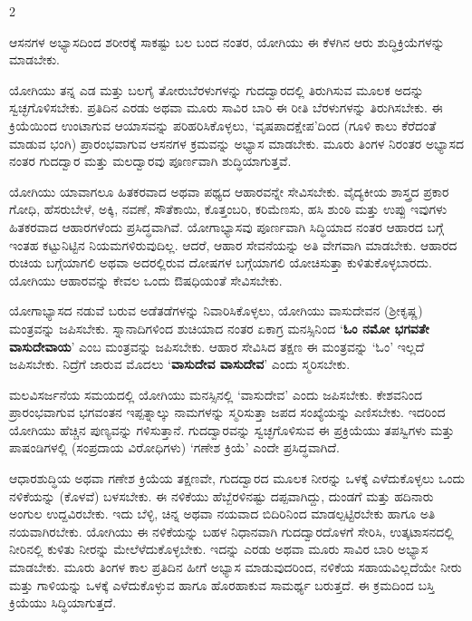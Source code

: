 \begin{multicols}{2}
\begin{kan}
ಆಸನಗಳ ಅಭ್ಯಾಸದಿಂದ ಶರೀರಕ್ಕೆ ಸಾಕಷ್ಟು ಬಲ ಬಂದ ನಂತರ, ಯೋಗಿಯು ಈ ಕೆಳಗಿನ ಆರು ಶುದ್ಧಿಕ್ರಿಯೆಗಳನ್ನು ಮಾಡಬೇಕು.
\vskip 7pt


ಯೋಗಿಯು ತನ್ನ ಎಡ ಮತ್ತು ಬಲಗೈ ತೋರುಬೆರಳುಗಳನ್ನು ಗುದದ್ವಾರದಲ್ಲಿ ತಿರುಗಿಸುವ ಮೂಲಕ ಅದನ್ನು ಸ್ವಚ್ಛಗೊಳಿಸಬೇಕು. ಪ್ರತಿದಿನ ಎರಡು ಅಥವಾ ಮೂರು ಸಾವಿರ ಬಾರಿ ಈ ರೀತಿ ಬೆರಳುಗಳನ್ನು ತಿರುಗಿಸಬೇಕು. ಈ ಕ್ರಿಯೆಯಿಂದ ಉಂಟಾಗುವ ಆಯಾಸವನ್ನು ಪರಿಹರಿಸಿಕೊಳ್ಳಲು, ‘ವೃಷಪಾದಕ್ಷೇಪ’ದಿಂದ (ಗೂಳಿ ಕಾಲು ಕೆರೆದಂತೆ ಮಾಡುವ ಭಂಗಿ) ಪ್ರಾರಂಭವಾಗುವ ಆಸನಗಳ ಕ್ರಮವನ್ನು ಅಭ್ಯಾಸ ಮಾಡಬೇಕು. ಮೂರು ತಿಂಗಳ ನಿರಂತರ ಅಭ್ಯಾಸದ ನಂತರ ಗುದದ್ವಾರ ಮತ್ತು ಮಲದ್ವಾರವು ಪೂರ್ಣವಾಗಿ ಶುದ್ಧಿಯಾಗುತ್ತವೆ.
\vskip 7pt


ಯೋಗಿಯು ಯಾವಾಗಲೂ ಹಿತಕರವಾದ ಅಥವಾ ಪಥ್ಯದ ಆಹಾರವನ್ನೇ ಸೇವಿಸಬೇಕು. ವೈದ್ಯಕೀಯ ಶಾಸ್ತ್ರದ ಪ್ರಕಾರ ಗೋಧಿ, ಹೆಸರುಬೇಳೆ, ಅಕ್ಕಿ, ನವಣೆ, ಸೌತೆಕಾಯಿ, ಕೊತ್ತಂಬರಿ, ಕರಿಮೆಣಸು, ಹಸಿ ಶುಂಠಿ ಮತ್ತು ಉಪ್ಪು ಇವುಗಳು ಹಿತಕರವಾದ ಆಹಾರಗಳೆಂದು ಪ್ರಸಿದ್ಧವಾಗಿವೆ. ಯೋಗಾಭ್ಯಾಸವು ಪೂರ್ಣವಾಗಿ ಸಿದ್ಧಿಯಾದ ನಂತರ ಆಹಾರದ ಬಗ್ಗೆ ಇಂತಹ ಕಟ್ಟುನಿಟ್ಟಿನ ನಿಯಮಗಳಿರುವುದಿಲ್ಲ. ಆದರೆ, ಆಹಾರ ಸೇವನೆಯನ್ನು ಅತಿ ವೇಗವಾಗಿ ಮಾಡಬೇಕು. ಆಹಾರದ ರುಚಿಯ ಬಗ್ಗೆಯಾಗಲಿ ಅಥವಾ ಅದರಲ್ಲಿರುವ ದೋಷಗಳ ಬಗ್ಗೆಯಾಗಲಿ ಯೋಚಿಸುತ್ತಾ ಕುಳಿತುಕೊಳ್ಳಬಾರದು. ಯೋಗಿಯು ಆಹಾರವನ್ನು ಕೇವಲ ಒಂದು ಔಷಧಿಯಂತೆ ಸೇವಿಸಬೇಕು.
\vskip 7pt


ಯೋಗಾಭ್ಯಾಸದ ನಡುವೆ ಬರುವ ಅಡೆತಡೆಗಳನ್ನು ನಿವಾರಿಸಿಕೊಳ್ಳಲು, ಯೋಗಿಯು ವಾಸುದೇವನ (ಶ್ರೀಕೃಷ್ಣ) ಮಂತ್ರವನ್ನು ಜಪಿಸಬೇಕು. ಸ್ನಾನಾದಿಗಳಿಂದ ಶುಚಿಯಾದ ನಂತರ ಏಕಾಗ್ರ ಮನಸ್ಸಿನಿಂದ ‘\textbf{ಓಂ ನಮೋ ಭಗವತೇ ವಾಸುದೇವಾಯ}’ ಎಂಬ ಮಂತ್ರವನ್ನು ಜಪಿಸಬೇಕು. ಆಹಾರ ಸೇವಿಸಿದ ತಕ್ಷಣ ಈ ಮಂತ್ರವನ್ನು ‘ಓಂ’ ಇಲ್ಲದೆ ಜಪಿಸಬೇಕು. ನಿದ್ರೆಗೆ ಜಾರುವ ಮೊದಲು ‘\textbf{ವಾಸುದೇವ ವಾಸುದೇವ}’ ಎಂದು ಸ್ಮರಿಸಬೇಕು.

ಮಲವಿಸರ್ಜನೆಯ ಸಮಯದಲ್ಲಿ ಯೋಗಿಯು ಮನಸ್ಸಿನಲ್ಲಿ ‘ವಾಸುದೇವ’ ಎಂದು ಜಪಿಸಬೇಕು. ಕೇಶವನಿಂದ ಪ್ರಾರಂಭವಾಗುವ ಭಗವಂತನ ಇಪ್ಪತ್ನಾಲ್ಕು ನಾಮಗಳನ್ನು ಸ್ಮರಿಸುತ್ತಾ ಜಪದ ಸಂಖ್ಯೆಯನ್ನು ಎಣಿಸಬೇಕು. ಇದರಿಂದ ಯೋಗಿಯು ಹೆಚ್ಚಿನ ಪುಣ್ಯವನ್ನು ಗಳಿಸುತ್ತಾನೆ. ಗುದದ್ವಾರವನ್ನು ಸ್ವಚ್ಛಗೊಳಿಸುವ ಈ ಪ್ರಕ್ರಿಯೆಯು ತಪಸ್ವಿಗಳು ಮತ್ತು ಪಾಷಂಡಿಗಳಲ್ಲಿ (ಸಂಪ್ರದಾಯ ವಿರೋಧಿಗಳು) ‘ಗಣೇಶ ಕ್ರಿಯೆ’ ಎಂದೇ ಪ್ರಸಿದ್ಧವಾಗಿದೆ.
\vskip 7pt


ಆಧಾರಶುದ್ಧಿಯ ಅಥವಾ ಗಣೇಶ ಕ್ರಿಯೆಯ ತಕ್ಷಣವೇ, ಗುದದ್ವಾರದ ಮೂಲಕ ನೀರನ್ನು ಒಳಕ್ಕೆ ಎಳೆದುಕೊಳ್ಳಲು ಒಂದು ನಳಿಕೆಯನ್ನು (ಕೊಳವೆ) ಬಳಸಬೇಕು. ಈ ನಳಿಕೆಯು ಹೆಬ್ಬೆರಳಿನಷ್ಟು ದಪ್ಪವಾಗಿದ್ದು, ದುಂಡಗೆ ಮತ್ತು ಹದಿನಾರು ಅಂಗುಲ ಉದ್ದವಿರಬೇಕು. ಇದು ಬೆಳ್ಳಿ, ಚಿನ್ನ ಅಥವಾ ನಯವಾದ ಬಿದಿರಿನಿಂದ ಮಾಡಲ್ಪಟ್ಟಿರಬೇಕು ಹಾಗೂ ಅತಿ ನಯವಾಗಿರಬೇಕು. ಯೋಗಿಯು ಈ ನಳಿಕೆಯನ್ನು ಬಹಳ ನಿಧಾನವಾಗಿ ಗುದದ್ವಾರದೊಳಗೆ ಸೇರಿಸಿ, ಉತ್ಕಟಾಸನದಲ್ಲಿ ನೀರಿನಲ್ಲಿ ಕುಳಿತು ನೀರನ್ನು ಮೇಲೆಳೆದುಕೊಳ್ಳಬೇಕು. ಇದನ್ನು ಎರಡು ಅಥವಾ ಮೂರು ಸಾವಿರ ಬಾರಿ ಅಭ್ಯಾಸ ಮಾಡಬೇಕು. ಮೂರು ತಿಂಗಳ ಕಾಲ ಪ್ರತಿದಿನ ಹೀಗೆ ಅಭ್ಯಾಸ ಮಾಡುವುದರಿಂದ, ನಳಿಕೆಯ ಸಹಾಯವಿಲ್ಲದೆಯೇ ನೀರು ಮತ್ತು ಗಾಳಿಯನ್ನು ಒಳಕ್ಕೆ ಎಳೆದುಕೊಳ್ಳುವ ಹಾಗೂ ಹೊರಹಾಕುವ ಸಾಮರ್ಥ್ಯ ಬರುತ್ತದೆ. ಈ ಕ್ರಮದಿಂದ ಬಸ್ತಿ ಕ್ರಿಯೆಯು ಸಿದ್ಧಿಯಾಗುತ್ತದೆ.
\vskip 7pt


\end{kan}
\end{multicols}
